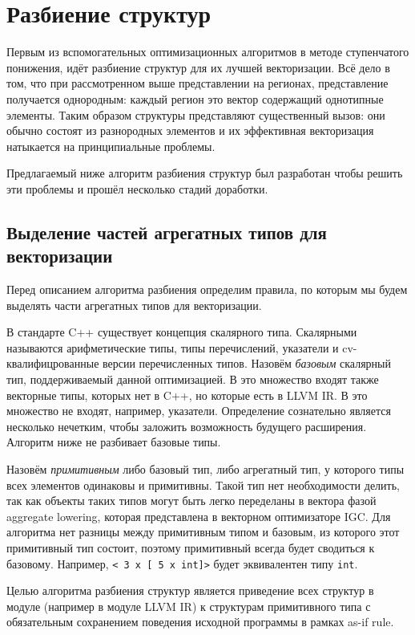 \section{Разбиение структур}\label{sec:lowering/splitter}

Первым из вспомогательных оптимизационных алгоритмов в методе ступенчатого понижения, идёт разбиение структур для их лучшей векторизации. Всё дело в том, что при рассмотренном выше представлении на регионах, представление получается однородным: каждый регион это вектор содержащий однотипные элементы. Таким образом структуры представляют существенный вызов: они обычно состоят из разнородных элементов и их эффективная векторизация натыкается на принципиальные проблемы.

Предлагаемый ниже алгоритм разбиения структур был разработан чтобы решить эти проблемы и прошёл несколько стадий доработки.

\subsection{Выделение частей агрегатных типов для векторизации}\label{subsec:lowering/splitter/vectorization}

Перед описанием алгоритма разбиения определим правила, по которым мы будем выделять части агрегатных типов для векторизации.

В стандарте C++ существует концепция скалярного типа. Скалярными называются арифметические типы, типы перечислений, указатели и cv-квалифицрованные версии перечисленных типов. Назовём \emph{базовым} скалярный тип, поддерживаемый данной оптимизацией. В это множество входят также векторные типы, которых нет в C++, но которые есть в LLVM IR.  В это множество не входят, например, указатели. Определение сознательно является несколько нечетким, чтобы заложить возможность будущего расширения. Алгоритм ниже не разбивает базовые типы.

Назовём \emph{примитивным} либо базовый тип, либо агрегатный тип, у которого типы всех элементов одинаковы и примитивны. Такой тип нет необходимости делить, так как объекты таких типов могут быть легко переделаны в вектора фазой aggregate lowering, которая представлена в векторном оптимизаторе IGC. Для алгоритма нет разницы между примитивным типом и базовым, из которого этот примитивный тип состоит, поэтому примитивный всегда будет сводиться к базовому. Например, \verb|< 3 x [ 5 x int]>| будет эквивалентен типу \verb|int|.

Целью алгоритма разбиения структур является приведение всех структур в модуле (например в модуле LLVM IR) к структурам примитивного типа с обязательным сохранением поведения исходной программы в рамках as-if rule.

